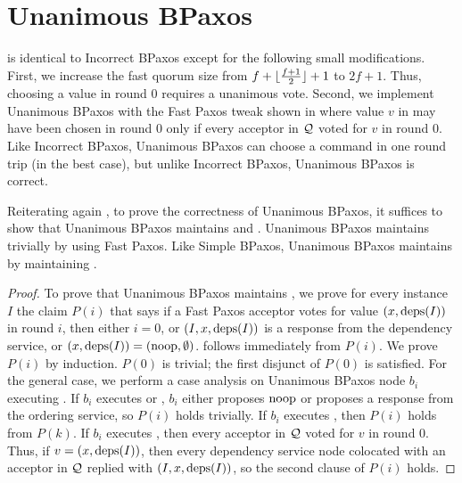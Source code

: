\section{Unanimous BPaxos}
 is identical to Incorrect BPaxos except for the
following small modifications.  First, we increase the fast quorum size from
$f + \lfloor\frac{f + 1}{2}\rfloor + 1$ to $2f + 1$. Thus, choosing a value in round $0$ requires a
unanimous vote. Second, we implement Unanimous BPaxos with the Fast Paxos
tweak shown in  where value $v$ in
 may have been chosen in round $0$ only if every
acceptor in $\mathcal{Q}$ voted for $v$ in round $0$.
%
Like Incorrect BPaxos, Unanimous BPaxos can choose a command in one round trip
(in the best case), but unlike Incorrect BPaxos, Unanimous BPaxos is correct.

Reiterating again , to prove the correctness of
Unanimous BPaxos, it suffices to show that Unanimous BPaxos maintains
 and . Unanimous BPaxos
maintains  trivially by using Fast Paxos. Like
Simple BPaxos, Unanimous BPaxos maintains  by
maintaining .

\begin{proof}
  To prove that Unanimous BPaxos maintains , we
  prove for every instance $I$ the claim $P(i)$ that says if a Fast Paxos
  acceptor votes for value $(x, \text{deps}(I))$ in round $i$, then either $i = 0$,
  or $(I, x, \text{deps}(I))$ is a response from the dependency service, or $(x,
  \text{deps}(I)) = (\text{noop}, \emptyset)$.
   follows immediately from $P(i)$. We prove
  $P(i)$ by induction. $P(0)$ is trivial; the first disjunct of $P(0)$ is
  satisfied. For the general case, we perform a case analysis on Unanimous
  BPaxos node $b_i$ executing .
  If $b_i$ executes  or
  , $b_i$ either proposes $\text{noop}$ or proposes
  a response from the ordering service, so $P(i)$ holds trivially.
  If $b_i$ executes , then $P(i)$ holds from
  $P(k)$.
  If $b_i$ executes , then every acceptor in
  $\mathcal{Q}$ voted for $v$ in round $0$. Thus, if $v = (x, \text{deps}(I))$, then
  every dependency service node colocated with an acceptor in $\mathcal{Q}$ replied
  with $(I, x, \text{deps}(I))$, so the second clause of $P(i)$ holds.
\end{proof}

